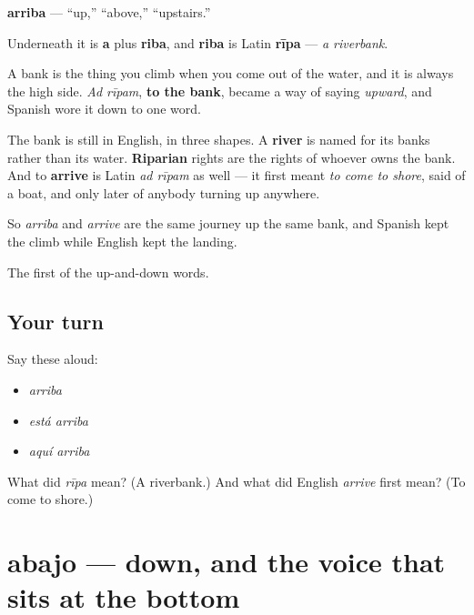 \begin{cousinweb}
\textbf{arriba} — \textquotedblleft{}up,\textquotedblright{} \textquotedblleft{}above,\textquotedblright{} \textquotedblleft{}upstairs.\textquotedblright{}

Underneath it is \textbf{a} plus \textbf{riba}, and \textbf{riba} is Latin \textbf{rīpa} — \emph{a riverbank}.

A bank is the thing you climb when you come out of the water, and it is always the high side. \emph{Ad rīpam}, \textbf{to the bank}, became a way of saying \emph{upward}, and Spanish wore it down to one word.

The bank is still in English, in three shapes. A \textbf{river} is named for its banks rather than its water. \textbf{Riparian} rights are the rights of whoever owns the bank. And to \textbf{arrive} is Latin \emph{ad rīpam} as well — it first meant \emph{to come to shore}, said of a boat, and only later of anybody turning up anywhere.

So \emph{arriba} and \emph{arrive} are the same journey up the same bank, and Spanish kept the climb while English kept the landing.
\end{cousinweb}

\begin{grammarlens}[title={What you've built}]
The first of the up-and-down words.
\end{grammarlens}

\subsection*{Your turn}
Say these aloud:

\begin{itemize}
\raggedright
  \item \emph{arriba}
  \item \emph{está arriba}
  \item \emph{aquí arriba}
\end{itemize}

\begin{tcolorbox}[breakable,colback=teal!4,colframe=teal!35!black,title={Before you move on}]
What did \emph{rīpa} mean? (A riverbank.) And what did English \emph{arrive} first mean? (To come to shore.)
\end{tcolorbox}
\section[abajo]{abajo — down, and the voice that sits at the bottom}

